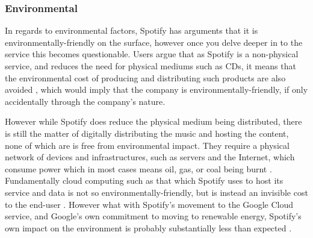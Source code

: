 \subsubsection{Environmental} \label{environment:environmental}
In regards to environmental factors, Spotify has arguments that it is environmentally-friendly on the surface, however once you delve deeper in to the service this becomes questionable. Users argue that as Spotify is a non-physical service, and reduces the need for physical mediums such as CDs, it means that the environmental cost of producing and distributing such products are also avoided \parencite{spotify_green_pro}, which would imply that the company is environmentally-friendly, if only accidentally through the company's nature. 
\par
However while Spotify does reduce the physical medium being distributed, there is still the matter of digitally distributing the music and hosting the content, none of which are is free from environmental impact. They require a physical network of devices and infrastructures, such as servers and the Internet, which consume power which in most cases means oil, gas, or coal being burnt \parencite{world_energy_stats}. Fundamentally cloud computing such as that which Spotify uses to host its service and data is not so environmentally-friendly, but is instead an invisible cost to the end-user \parencite{internet_isnt_so_clean}. However what with Spotify's movement to the Google Cloud service, and Google's own commitment to moving to renewable energy, Spotify's own impact on the environment is probably substantially less than expected \parencite{spotify_announce_google_cloud, google_renewable}.